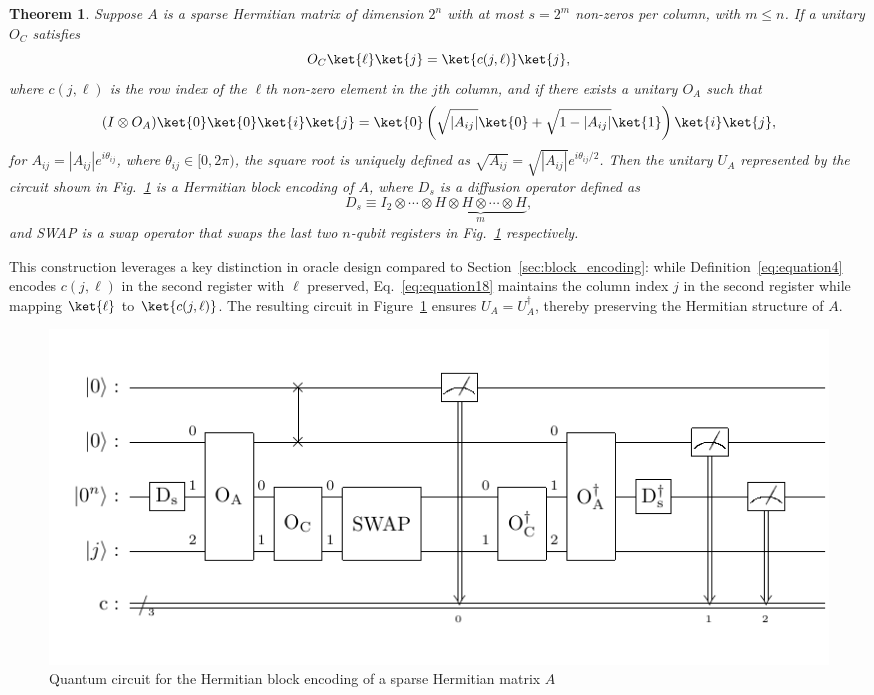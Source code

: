 \documentclass{article}
\newtheorem{theorem}{Theorem}[section]
\begin{document}
    \begin{theorem}
        Suppose $A$ is a sparse Hermitian matrix of dimension $2^n$ with at most $s = 2^m$ non-zeros per column, with $m \leq n$. If a unitary $O_C$ satisfies
        \begin{equation}
            O_C \ket{\ell} \ket{j} = \ket{c(j, \ell)} \ket{j},\label{eq:equation18}
        \end{equation}
        where $c(j, \ell)$ is the row index of the $\ell$th non-zero element in the $j$th column, and if there exists a unitary $O_A$ such that
        \begin{equation}
        (I \otimes O_A)
            \ket{0} \ket{0} \ket{i} \ket{j} = \ket{0} \left( \sqrt{|A_{ij}|} \ket{0} + \sqrt{1 - |A_{ij}|} \ket{1} \right) \ket{i} \ket{j},
        \end{equation}
        for $A_{ij} = |A_{ij}| e^{i \theta_{ij}}$, where $\theta_{ij} \in [0, 2\pi)$, the square root is uniquely defined as $\sqrt{A_{ij}} = \sqrt{|A_{ij}|} e^{i \theta_{ij}/2}$. Then the unitary $U_A$ represented by the circuit shown in Fig.~\ref{fig:hermitian_encoding} is a Hermitian block encoding of $A$, where $D_s$ is a diffusion operator defined as
        \begin{equation}
            D_s \equiv I_2 \otimes \cdots \otimes
            \underbrace{H \otimes H \otimes \cdots \otimes H}_{m},
        \end{equation}
        and SWAP is a swap operator that swaps the last two $n$-qubit registers in Fig.~\ref{fig:hermitian_encoding} respectively.
        \label{thm:main_result2}
    \end{theorem}

    This construction leverages a key distinction in oracle design compared to Section~\ref{sec:block_encoding}: while Definition~\ref{eq:equation4} encodes $c(j, \ell)$ in the second register with $\ell$ preserved, Eq.~\ref{eq:equation18} maintains the column index $j$ in the second register while mapping $\ket{\ell}$ to $\ket{c(j, \ell)}$. The resulting circuit in Figure~\ref{fig:hermitian_encoding} ensures $U_A = U_A^\dagger$, thereby preserving the Hermitian structure of $A$.

    \begin{figure}[htbp]
        \centering
        \includegraphics{pdf/hermitian_circuit}
        \caption{Quantum circuit for the Hermitian block encoding of a sparse Hermitian matrix $A$}
        \label{fig:hermitian_encoding}
    \end{figure}
\end{document}
